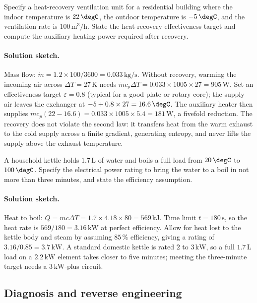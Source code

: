 \begin{exercise}
Specify a heat-recovery ventilation unit for a residential building
where the indoor temperature is $22\,\degC$, the outdoor temperature
is $-5\,\degC$, and the ventilation rate is $100\,\text{m}^3/\text{h}$.
State the heat-recovery effectiveness target and compute the
auxiliary heating power required after recovery.
\paragraph{Solution sketch.} Mass flow:
$\dot{m} = 1.2 \times 100/3600 = 0.033\,\text{kg}/\text{s}$. Without
recovery, warming the incoming air across $\Delta T = 27\,\si{\kelvin}$
needs $\dot{m}c_p\Delta T = 0.033 \times 1005 \times 27 =
905\,\text{W}$. Set an effectiveness target $\varepsilon = 0.8$
(typical for a good plate or rotary core); the supply air leaves the
exchanger at $-5 + 0.8 \times 27 = 16.6\,\degC$. The auxiliary heater
then supplies $\dot{m}c_p(22 - 16.6) = 0.033 \times 1005 \times 5.4 =
181\,\text{W}$, a fivefold reduction. The recovery does not violate the
second law: it transfers heat from the warm exhaust to the cold supply
across a finite gradient, generating entropy, and never lifts the
supply above the exhaust temperature.
\end{exercise}

\begin{exercise}
A household kettle holds $1.7\,\text{L}$ of water and boils a full
load from $20\,\degC$ to $100\,\degC$. Specify the electrical power
rating to bring the water to a boil in not more than three minutes,
and state the efficiency assumption.
\paragraph{Solution sketch.} Heat to boil:
$Q = mc\Delta T = 1.7 \times 4.18 \times 80 = 569\,\text{kJ}$. Time
limit $t = 180\,\text{s}$, so the heat rate is $569/180 =
3.16\,\text{kW}$ at perfect efficiency. Allow for heat lost to the
kettle body and steam by assuming $85\,\%$ efficiency, giving a rating
of $3.16/0.85 = 3.7\,\text{kW}$. A standard domestic kettle is rated
$2$ to $3\,\text{kW}$, so a full $1.7\,\text{L}$ load on a
$2.2\,\text{kW}$ element takes closer to five minutes; meeting the
three-minute target needs a $3\,\text{kW}$-plus circuit.
\end{exercise}

\subsection*{Diagnosis and reverse engineering}

